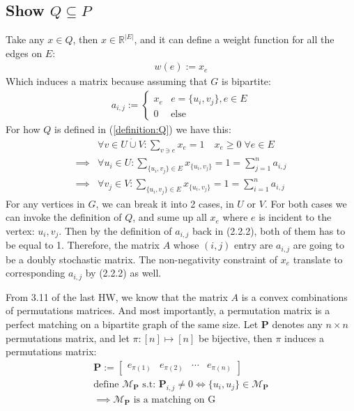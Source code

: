 \documentclass[]{article}
\theoremstyle{definition}
\begin{document}
    \subsection{Show $Q \subseteq P$}
        Take any $x\in Q$, then $x\in \mathbb R^{|E|}$, and it can define a weight function for all the edges on $E$: 
        \begin{align}
            w(e):= x_e
        \end{align}
        Which induces a matrix because assuming that $G$ is bipartite: 
        \begin{align}
            a_{i, j} := 
            \begin{cases}
                x_e & e=\{u_i, v_j\}, e\in E
                \\
                0 & \text{else}
            \end{cases}
        \end{align}
        For how $Q$ is defined in (\hyperref[definition:Q]{\ref*{definition:Q}}) we have this: 
        \begin{align}
            & \forall v \in U \dot\cup V:
            \sum_{v \ni e}^{}x_e = 1\quad x_e \ge 0 \; \forall e\in E
            \\
            \implies &
            \forall u_i \in U: \sum_{\{u_i, v_j\}\in E}^{} x_{\{u_i, v_j\}} = 1 = \sum_{j = 1}^{n} a_{i, j}
            \\
            \implies & 
            \forall v_j \in V: \sum_{\{u_i, v_j\}\in E}^{} x_{\{u_i, v_j\}} = 1 = \sum_{i = 1}^{n} a_{i, j}
        \end{align}
        For any vertices in $G$, we can break it into 2 cases, in $U$ or $V$. For both cases we can invoke the definition of $Q$, and sume up all $x_e$ where $e$ is incident to the vertex: $u_i, v_j$. Then by the definition of $a_{i, j}$ back in (2.2.2), both of them has to be equal to 1. Therefore, the matrix $A$ whose $(i, j)$ entry are $a_{i, j}$ are going to be a doubly stochastic matrix. The non-negativity constraint of $x_e$ translate to corresponding $a_{i, j}$ by (2.2.2) as well. 
        \par
        From 3.11 of the last HW, we know that the matrix $A$ is a convex combinations of permutations matrices. And most importantly, a permutation matrix is a perfect matching on a bipartite graph of the same size. Let $\mathbf P$ denotes any $n\times n$ permutations matrix, and let $\pi:[n]\mapsto [n]$ be bijective, then $\pi$ induces a permutations matrix: 
        \begin{align}
            \mathbf P := \begin{bmatrix}
                e_{\pi(1)} & e_{\pi(2)} & \cdots & e_{\pi(n)}
            \end{bmatrix}
            \\
            \text{define }\mathcal M_{\mathbf P} \text{ s.t: }
            \mathbf P_{i, j} \neq 0 \iff 
            \{u_i, u_j\} \in \mathcal M_{\mathbf P}
            \\
            \implies \mathcal M_{\mathbf P} \text{ is a matching on G}
        \end{align}
\end{document}
